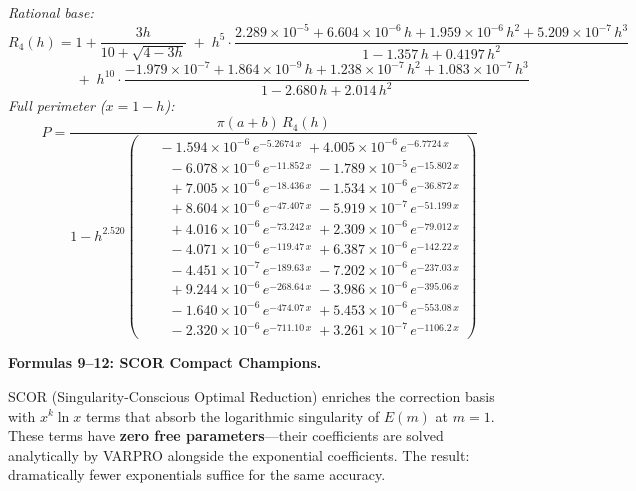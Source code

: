 \documentclass[12pt]{article}
\begin{document}
\smallskip\noindent\emph{Rational base:}
\[
R_4(h) = 1 + \frac{3h}{10+\sqrt{4{-}3h}}
  \;+\; h^5\!\cdot\!\frac{2.289{\times}10^{-5} + 6.604{\times}10^{-6}\,h + 1.959{\times}10^{-6}\,h^2 + 5.209{\times}10^{-7}\,h^3}
       {1 - 1.357\,h + 0.4197\,h^2}
\]
\vspace{-8pt}
\[
  \phantom{R_4(h) = {}}
  +\; h^{10}\!\cdot\!\frac{-1.979{\times}10^{-7} + 1.864{\times}10^{-9}\,h + 1.238{\times}10^{-7}\,h^2 + 1.083{\times}10^{-7}\,h^3}
       {1 - 2.680\,h + 2.014\,h^2}
\]
\emph{Full perimeter ($x = 1-h$):}
\begin{equation*}
P = \frac{\pi(a{+}b)\,R_4(h)}{1 - h^{2.520}\!\left(\!\begin{aligned}
  &\; -1.594{\times}10^{-6}\,e^{-5.2674\,x} \; +4.005{\times}10^{-6}\,e^{-6.7724\,x} \\[-3pt]
  &\quad -6.078{\times}10^{-6}\,e^{-11.852\,x} \; -1.789{\times}10^{-5}\,e^{-15.802\,x} \\[-3pt]
  &\quad +7.005{\times}10^{-6}\,e^{-18.436\,x} \; -1.534{\times}10^{-6}\,e^{-36.872\,x} \\[-3pt]
  &\quad +8.604{\times}10^{-6}\,e^{-47.407\,x} \; -5.919{\times}10^{-7}\,e^{-51.199\,x} \\[-3pt]
  &\quad +4.016{\times}10^{-6}\,e^{-73.242\,x} \; +2.309{\times}10^{-6}\,e^{-79.012\,x} \\[-3pt]
  &\quad -4.071{\times}10^{-6}\,e^{-119.47\,x} \; +6.387{\times}10^{-6}\,e^{-142.22\,x} \\[-3pt]
  &\quad -4.451{\times}10^{-7}\,e^{-189.63\,x} \; -7.202{\times}10^{-6}\,e^{-237.03\,x} \\[-3pt]
  &\quad +9.244{\times}10^{-6}\,e^{-268.64\,x} \; -3.986{\times}10^{-6}\,e^{-395.06\,x} \\[-3pt]
  &\quad -1.640{\times}10^{-6}\,e^{-474.07\,x} \; +5.453{\times}10^{-6}\,e^{-553.08\,x} \\[-3pt]
  &\quad -2.320{\times}10^{-6}\,e^{-711.10\,x} \; +3.261{\times}10^{-7}\,e^{-1106.2\,x}
\end{aligned}\!\right)}
\end{equation*}

\bigskip

\noindent\textbf{Formulas 9--12: SCOR Compact Champions.}

\smallskip\noindent
SCOR (Singularity-Conscious Optimal Reduction) enriches the correction basis with $x^k\ln x$ terms that absorb the logarithmic singularity of $E(m)$ at $m=1$.  These terms have \textbf{zero free parameters}---their coefficients are solved analytically by VARPRO alongside the exponential coefficients.  The result: dramatically fewer exponentials suffice for the same accuracy.
\end{document}
